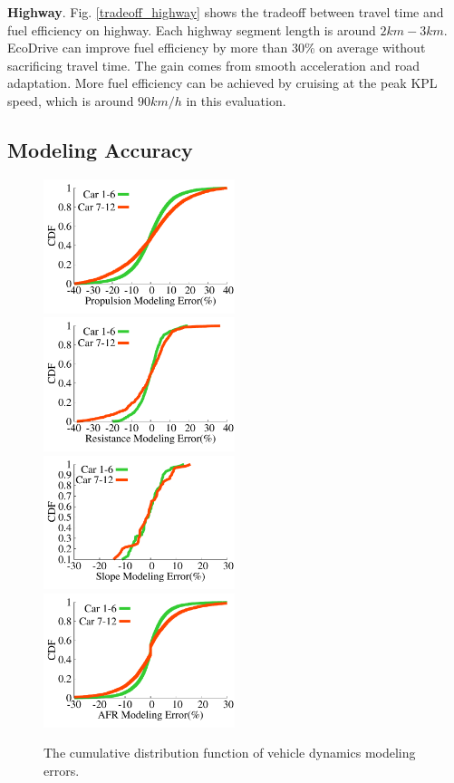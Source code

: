 \textbf{Highway}.  
Fig. \ref{tradeoff_highway} shows the tradeoff between travel time and fuel efficiency on highway. 
Each highway segment length is around $2km-3km$. 
EcoDrive can improve fuel efficiency by more than 30\% on average without sacrificing travel time.    
The gain comes from smooth acceleration and road adaptation. 
More fuel efficiency can be achieved by cruising at the peak KPL speed, 
which is around $90km/h$ in this evaluation. 

\subsection{Modeling Accuracy}


\begin{figure}[!htbp]
\begin{center}
\vspace{-0.2cm}
\includegraphics[width=2.2in,angle=0]{Figs/EcoDrive/evaluation/propulsion_error_cdf_2.pdf}
\vspace{-0.2cm}
\includegraphics[width=2.2in,angle=0]{Figs/EcoDrive/evaluation/resistance_error_cdf_2.pdf}
\vspace{-0.2cm}
\includegraphics[width=2.2in,angle=0]{Figs/EcoDrive/evaluation/slope_error_cdf_2.pdf}
\vspace{-0.2cm}
\includegraphics[width=2.2in,angle=0]{Figs/EcoDrive/evaluation/afr_profile_error_cdf_2.pdf}
\caption{The cumulative distribution function of vehicle dynamics modeling errors.}
\vspace{-0.6cm}
\label{modelingaccuracy}
\end{center}
\end{figure}

